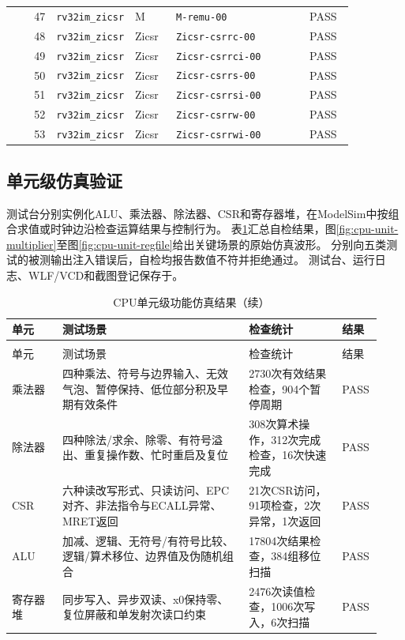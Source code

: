 \begin{reporttable}
\begin{longtable}{@{}r p{0.22\linewidth}p{0.12\linewidth}p{0.39\linewidth}p{0.13\linewidth}@{}}
47 & \texttt{rv32im\_zicsr} & M & \texttt{M-remu-00} & PASS \\
48 & \texttt{rv32im\_zicsr} & Zicsr & \texttt{Zicsr-csrrc-00} & PASS \\
49 & \texttt{rv32im\_zicsr} & Zicsr & \texttt{Zicsr-csrrci-00} & PASS \\
50 & \texttt{rv32im\_zicsr} & Zicsr & \texttt{Zicsr-csrrs-00} & PASS \\
51 & \texttt{rv32im\_zicsr} & Zicsr & \texttt{Zicsr-csrrsi-00} & PASS \\
52 & \texttt{rv32im\_zicsr} & Zicsr & \texttt{Zicsr-csrrw-00} & PASS \\
53 & \texttt{rv32im\_zicsr} & Zicsr & \texttt{Zicsr-csrrwi-00} & PASS \\
\end{longtable}
\end{reporttable}

\subsection{单元级仿真验证}

测试台分别实例化ALU、乘法器、除法器、CSR和寄存器堆，在ModelSim中按组合求值或时钟边沿检查运算结果与控制行为。
表\ref{tbl:cpu-unit-results}汇总自检结果，图\ref{fig:cpu-unit-multiplier}至图\ref{fig:cpu-unit-regfile}给出关键场景的原始仿真波形。
分别向五类测试的被测输出注入错误后，自检均报告数值不符并拒绝通过。
测试台、运行日志、WLF/VCD和截图登记保存于。

\begin{reporttable}
\begin{longtable}{@{}p{0.13\linewidth}p{0.48\linewidth}p{0.24\linewidth}p{0.08\linewidth}@{}}
\caption{CPU单元级功能仿真结果}\label{tbl:cpu-unit-results}\\
\toprule
单元 & 测试场景 & 检查统计 & 结果 \\
\midrule
\endfirsthead
\caption[]{CPU单元级功能仿真结果（续）}\\
\toprule
单元 & 测试场景 & 检查统计 & 结果 \\
\midrule
\endhead
\bottomrule
\endfoot
乘法器 & 四种乘法、符号与边界输入、无效气泡、暂停保持、低位部分积及早期有效条件 & 2730次有效结果检查，904个暂停周期 & PASS \\
除法器 & 四种除法/求余、除零、有符号溢出、重复操作数、忙时重启及复位 & 308次算术操作，312次完成检查，16次快速完成 & PASS \\
CSR & 六种读改写形式、只读访问、EPC对齐、非法指令与ECALL异常、MRET返回 & 21次CSR访问，91项检查，2次异常，1次返回 & PASS \\
ALU & 加减、逻辑、无符号/有符号比较、逻辑/算术移位、边界值及伪随机组合 & 17804次结果检查，384组移位扫描 & PASS \\
寄存器堆 & 同步写入、异步双读、x0保持零、复位屏蔽和单发射次读口约束 & 2476次读值检查，1006次写入，6次扫描 & PASS \\
\end{longtable}
\end{reporttable}

